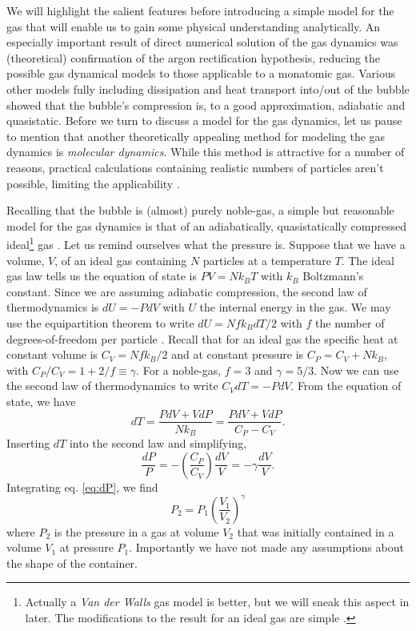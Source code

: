 \documentclass[prb,aps,nofootinbib,superscriptaddress,floatfix]{revtex4-2}
\begin{document}
We will highlight the salient features before introducing a simple model for the gas that will enable us to gain some physical understanding analytically. An especially important result of direct numerical solution of the gas dynamics was (theoretical) confirmation of the argon rectification hypothesis, reducing the possible gas dynamical models to those applicable to a monatomic gas. Various other models fully including dissipation and heat transport into/out of the bubble showed that the bubble's compression is, to a good approximation, adiabatic and quasistatic. Before we turn to discuss a model for the gas dynamics, let us pause to mention that another theoretically appealing method for modeling the gas dynamics is \emph{molecular dynamics}. While this method is attractive for a number of reasons, practical calculations containing realistic numbers of particles aren't possible, limiting the applicability \cite{brenner2002single}.

Recalling that the bubble is (almost) purely noble-gas, a simple but reasonable model for the gas dynamics is that of an adiabatically, quasistatically compressed ideal\footnote{Actually a \emph{Van der Walls} gas model is better, but we will sneak this aspect in later. The modifications to the result for an ideal gas are simple \cite{sivasubramanian2002temperature}.} gas \cite{brenner2002single}. Let us remind ourselves what the pressure is. Suppose that we have a volume, $V$, of an ideal gas containing $N$ particles at a temperature $T$. The ideal gas law tells us the equation of state is $PV=Nk_BT$ with $k_B$ Boltzmann's constant. Since we are assuming adiabatic compression, the second law of thermodynamics is $dU=-PdV$ with $U$ the internal energy in the gas. We may use the equipartition theorem to write $dU=N f k_B dT/2$ with $f$ the number of degrees-of-freedom per particle \cite{schroeder1999introduction}. Recall that for an ideal gas the specific heat at constant volume is $C_V = N f k_B/2$ and at constant pressure is $C_P = C_V+N k_B$, with $C_P/C_V = 1+2/f \equiv \gamma$. For a noble-gas, $f=3$ and $\gamma=5/3$. Now we can use the second law of thermodynamics to write $C_V dT = -P dV$. From the equation of state, we have
\begin{equation}
    dT = \frac{PdV+VdP}{Nk_B}=\frac{PdV+VdP}{C_P-C_V}.
\end{equation}
Inserting $dT$ into the second law and simplifying, 
\begin{equation}
    \frac{dP}{P}=-\left(\frac{C_P}{C_V}\right) \frac{dV}{V} = -\gamma \frac{dV}{V}.
    \label{eq:dP}
\end{equation}
Integrating eq. \ref{eq:dP}, we find 
\begin{equation}
    P_2 = P_1 \left(\frac{V_1}{V_2}\right)^\gamma
\label{eq:P}
\end{equation}
where $P_2$ is the pressure in a gas at volume $V_2$ that was initially contained in a volume $V_1$ at pressure $P_1$. Importantly we have not made any assumptions about the shape of the container. 
\end{document}
